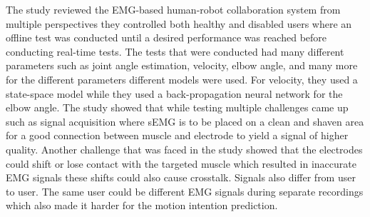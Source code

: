 The study reviewed the EMG-based human-robot collaboration system from multiple perspectives they controlled both healthy and disabled users where an offline test was conducted until a desired performance was reached before conducting
real-time tests. The tests that were conducted had many different parameters such as joint angle estimation, velocity, elbow angle, and many more for the different parameters different models were used. 
For velocity, they used a state-space model while they used a back-propagation neural network for the elbow angle. The study showed that while testing multiple challenges came up such as signal acquisition where sEMG
is to be placed on a clean and shaven area for a good connection between muscle and electrode to yield a signal of higher quality. Another challenge that was faced in the study showed that the electrodes could shift or lose contact 
with the targeted muscle which resulted in inaccurate EMG signals these shifts could also cause crosstalk. Signals also differ from user to user. The same user could be different EMG signals during separate recordings which also made it 
harder for the motion intention prediction.